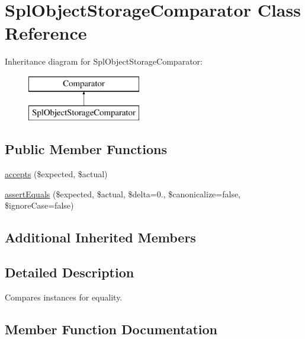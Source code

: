 \hypertarget{class_sebastian_bergmann_1_1_comparator_1_1_spl_object_storage_comparator}{}\section{Spl\+Object\+Storage\+Comparator Class Reference}
\label{class_sebastian_bergmann_1_1_comparator_1_1_spl_object_storage_comparator}
Inheritance diagram for Spl\+Object\+Storage\+Comparator\+:\begin{figure}[H]
\begin{center}
\leavevmode
\includegraphics[height=2.000000cm]{class_sebastian_bergmann_1_1_comparator_1_1_spl_object_storage_comparator}
\end{center}
\end{figure}
\subsection*{Public Member Functions}
\begin{DoxyCompactItemize}
\item 
\mbox{\hyperlink{class_sebastian_bergmann_1_1_comparator_1_1_spl_object_storage_comparator_ae9bdf0cba02ce3470169280656cdeb84}{accepts}} (\$expected, \$actual)
\item 
\mbox{\hyperlink{class_sebastian_bergmann_1_1_comparator_1_1_spl_object_storage_comparator_adb3679ea06503114394431cb250ec5a4}{assert\+Equals}} (\$expected, \$actual, \$delta=0., \$canonicalize=false, \$ignore\+Case=false)
\end{DoxyCompactItemize}
\subsection*{Additional Inherited Members}


\subsection{Detailed Description}
Compares  instances for equality. 

\subsection{Member Function Documentation}
\mbox{\label{class_sebastian_bergmann_1_1_comparator_1_1_spl_object_storage_comparator_ae9bdf0cba02ce3470169280656cdeb84}} 
